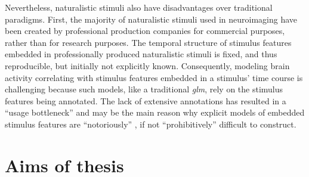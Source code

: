 Nevertheless, naturalistic stimuli also have disadvantages over traditional
paradigms.
First, the majority of naturalistic stimuli used in neuroimaging have been
created by professional production companies for commercial purposes, rather
than for research purposes.
The temporal structure of stimulus features embedded in professionally produced
naturalistic stimuli is fixed, and thus reproducible, but initially not
explicitly known.
Consequently, modeling brain activity correlating with stimulus features
embedded in a stimulus' time course is challenging
\citep{saarimaki2021naturalistic, simony2020analysis} because such models, like
a traditional \textit{\ac{glm}}, rely on the stimulus features being annotated.
The lack of extensive annotations has resulted in a ``usage bottleneck''
\citep[][p.  16]{aliko2020naturalistic} and may be the main reason why explicit
models of embedded stimulus features are ``notoriously'' \citep[][p.
1]{richard2019fast}, if not ``prohibitively'' \citep[p.
676]{nastase2019measuring} difficult to construct.


\begin{comment}

Second, considering practical and monetary constraints in a clinical context,
presenting a full feature film typically lasting 90 to 120 minutes is
inappropriate as an individual diagnostic procedure.

\end{comment}



\section{Aims of thesis}


